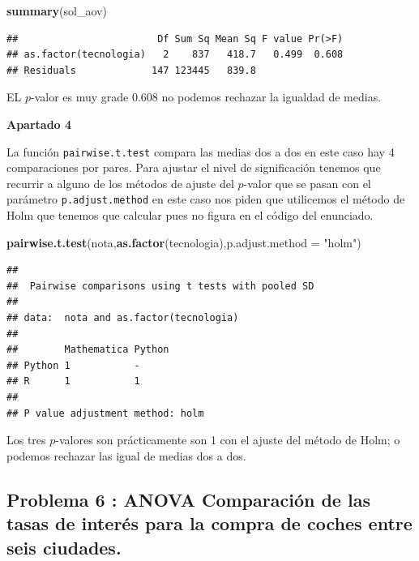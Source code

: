 \documentclass[
]{article}
\newenvironment{Shaded}{\begin{snugshade}}{\end{snugshade}}
\newcommand{\DataTypeTok}[1]{\textcolor[rgb]{0.13,0.29,0.53}{#1}}
\newcommand{\KeywordTok}[1]{\textcolor[rgb]{0.13,0.29,0.53}{\textbf{#1}}}
\newcommand{\NormalTok}[1]{#1}
\newcommand{\StringTok}[1]{\textcolor[rgb]{0.31,0.60,0.02}{#1}}
\begin{document}
\begin{Shaded}
\begin{Highlighting}[]
\KeywordTok{summary}\NormalTok{(sol\_aov)}
\end{Highlighting}
\end{Shaded}

\begin{verbatim}
##                        Df Sum Sq Mean Sq F value Pr(>F)
## as.factor(tecnologia)   2    837   418.7   0.499  0.608
## Residuals             147 123445   839.8
\end{verbatim}

EL \(p\)-valor es muy grade \(0.608\) no podemos rechazar la igualdad de
medias.

\textbf{Apartado 4}

La función \texttt{pairwise.t.test} compara las medias dos a dos en este
caso hay 4 comparaciones por pares. Para ajustar el nivel de
significación tenemos que recurrir a alguno de los métodos de ajuste del
\(p\)-valor que se pasan con el parámetro \texttt{p.adjust.method} en
este caso nos piden que utilicemos el método de Holm que tenemos que
calcular pues no figura en el código del enunciado.

\begin{Shaded}
\begin{Highlighting}[]
\KeywordTok{pairwise.t.test}\NormalTok{(nota,}\KeywordTok{as.factor}\NormalTok{(tecnologia),}\DataTypeTok{p.adjust.method =} \StringTok{"holm"}\NormalTok{)}
\end{Highlighting}
\end{Shaded}

\begin{verbatim}
## 
##  Pairwise comparisons using t tests with pooled SD 
## 
## data:  nota and as.factor(tecnologia) 
## 
##        Mathematica Python
## Python 1           -     
## R      1           1     
## 
## P value adjustment method: holm
\end{verbatim}

Los tres \(p\)-valores son prácticamente son 1 con el ajuste del método
de Holm; o podemos rechazar las igual de medias dos a dos.

\hypertarget{problema-6-anova-comparaciuxf3n-de-las-tasas-de-interuxe9s-para-la-compra-de-coches-entre-seis-ciudades.}{%
\subsection{Problema 6 : ANOVA Comparación de las tasas de interés para
la compra de coches entre seis
ciudades.}\label{problema-6-anova-comparaciuxf3n-de-las-tasas-de-interuxe9s-para-la-compra-de-coches-entre-seis-ciudades.}}
\end{document}
